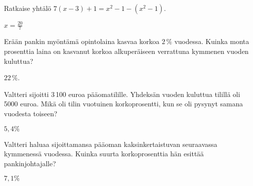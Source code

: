 \begin{tehtavasivu}
\begin{tehtava}
\begin{alakohdat}
\end{alakohdat}
\begin{vastaus}
\begin{alakohdat}
\end{alakohdat}
\end{vastaus}
\end{tehtava}

\begin{tehtava}
\begin{alakohdat}
\end{alakohdat}
\begin{vastaus}
\begin{alakohdat}
\end{alakohdat}
\end{vastaus}
\end{tehtava}

\begin{tehtava}
	Ratkaise yhtälö $7(x-3)+1=x^2-1-(x^2-1)$.
    \begin{vastaus}
	$x=\frac{20}{7}$
    \end{vastaus}
\end{tehtava}


\begin{tehtava}
    Erään pankin myöntämä opintolaina kasvaa korkoa $2\,\%$ vuodessa. Kuinka monta 
    prosenttia laina on kasvanut korkoa alkuperäiseen verrattuna kymmenen vuoden kuluttua?
    \begin{vastaus}
        $22\,\%$.
    \end{vastaus}
\end{tehtava}

\begin{tehtava}%
Valtteri sijoitti 3\,100 euroa pääomatilille. Yhdeksän vuoden kuluttua tilillä oli 5000 euroa. Mikä oli tilin vuotuinen korkoprosentti, kun se oli pysynyt samana vuodesta toiseen? 
\begin{vastaus}
$5,4\%$
\end{vastaus}
\end{tehtava}
\begin{tehtava}%
Valtteri haluaa sijoittamansa pääoman kaksinkertaistuvan seuraavassa kymmenessä vuodessa. Kuinka suurta korkoprosenttia hän esittää pankinjohtajalle?
\begin{vastaus}
$7,1\%$
\end{vastaus}
\end{tehtava}


\end{tehtavasivu}
